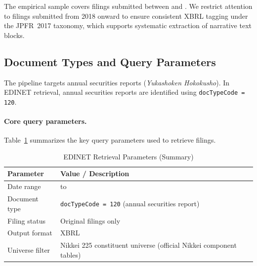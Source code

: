 The empirical sample covers filings submitted between \SampleStartDate{} and \SampleEndDate{}.
We restrict attention to filings submitted from 2018 onward to ensure consistent XBRL tagging under the JPFR~2017 taxonomy, which supports systematic extraction of narrative text blocks.

\subsection{Document Types and Query Parameters}
\label{appendix:edinet_doctype}

The pipeline targets annual securities reports (\emph{Yukashoken Hokokusho}). In EDINET retrieval, annual securities reports are identified using \texttt{docTypeCode = 120}.

\paragraph{Core query parameters.}
Table~\ref{tab:edinet_query_params} summarizes the key query parameters used to retrieve filings.

\begin{table}[h]
\centering
\caption{EDINET Retrieval Parameters (Summary)}
\label{tab:edinet_query_params}
\begin{tabular}{ll}
\toprule
\textbf{Parameter} & \textbf{Value / Description} \\
\midrule
Date range & \SampleStartDate{} to \SampleEndDate{} \\
Document type & \texttt{docTypeCode = 120} (annual securities report) \\
Filing status & Original filings only \\
Output format & XBRL \\
Universe filter & Nikkei 225 constituent universe (official Nikkei component tables) \\
\bottomrule
\end{tabular}
\end{table}



